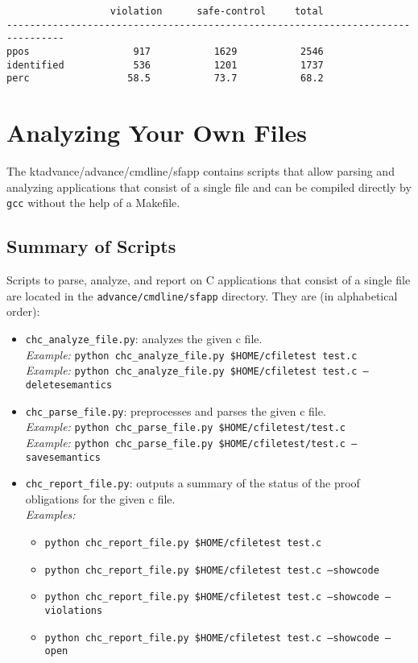 \documentclass[11pt]{article}
\begin{document}
\begin{scriptsize}
\begin{verbatim}
                  violation      safe-control     total
--------------------------------------------------------------------------------
ppos                  917           1629           2546
identified            536           1201           1737
perc                 58.5           73.7           68.2

\end{verbatim}
\end{scriptsize}

\section{Analyzing Your Own Files}
\label{sec:sfapp}

The {ktadvance/advance/cmdline/sfapp} contains scripts that allow parsing and
analyzing applications that consist of a single file and can be compiled directly
by {\tt gcc} without the help of a Makefile.

\subsection{Summary of Scripts}
Scripts to parse, analyze, and report on C applications that consist of a single file
are located in the {\tt advance/cmdline/sfapp} directory. They are (in alphabetical
order):
\begin{itemize}[leftmargin=*]
\item {\tt chc\_analyze\_file.py}: analyzes the given c file.\\
\emph{Example:} {\tt python chc\_analyze\_file.py \$HOME/cfiletest test.c} \\
\emph{Example:} {\tt python chc\_analyze\_file.py \$HOME/cfiletest test.c --deletesemantics}
\item {\tt chc\_parse\_file.py}: preprocesses and parses the given c file.\\
\emph{Example:} {\tt python chc\_parse\_file.py \$HOME/cfiletest/test.c} \\
\emph{Example:} {\tt python chc\_parse\_file.py \$HOME/cfiletest/test.c --savesemantics}
\item {\tt chc\_report\_file.py}: outputs a summary of the status of the proof obligations
  for the given c file.\\
\emph{Examples:} 
\begin{itemize}[leftmargin=*]
\item {\tt python chc\_report\_file.py \$HOME/cfiletest test.c}
\item {\tt python chc\_report\_file.py \$HOME/cfiletest test.c --showcode}
\item {\tt python chc\_report\_file.py \$HOME/cfiletest test.c --showcode --violations}
\item {\tt python chc\_report\_file.py \$HOME/cfiletest test.c --showcode --open}
\end{itemize}
\end{itemize}
\end{document}
